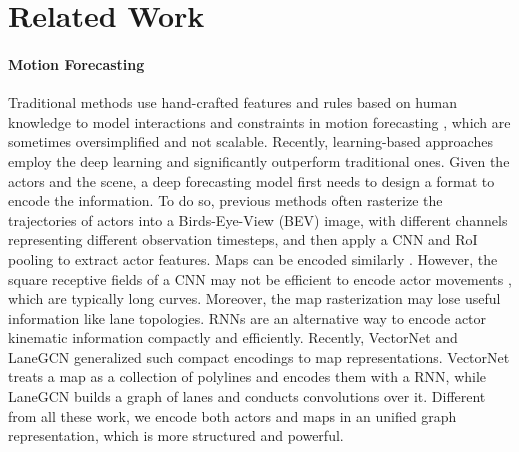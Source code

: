 


\section{Related Work}

\paragraph{Motion Forecasting}
Traditional methods use hand-crafted features and rules based on human knowledge 
to model interactions and constraints in motion forecasting
\cite{choi2013understanding,helbing1995social,mehran2009abnormal,yamaguchi2011you}, which are sometimes oversimplified and not scalable. 
Recently, learning-based approaches employ the deep learning and
significantly outperform traditional ones.
Given the actors and the scene, a deep
forecasting model first needs to design a format to encode the information.
To do so, previous methods \cite{precog,chauffeurnet,covernet} often rasterize
the trajectories of
actors into a Birds-Eye-View (BEV) image, with different channels representing
different observation timesteps, and then apply a CNN and RoI pooling
\cite{fasterrcnn} to extract actor features. 
Maps can be encoded similarly
\cite{nmp,dsd,intentnet,chauffeurnet,mfp}. 
However, the square receptive fields of a CNN may not be efficient to
encode actor movements \cite{lgn}, which are typically long curves.
Moreover, the map rasterization may lose useful information like lane topologies. 
RNNs are an alternative way to encode actor kinematic information
\cite{matf,mfp,vectornet,tnt,socialgan,sociallstm} compactly and efficiently.
Recently, VectorNet \cite{vectornet} and LaneGCN \cite{lgn} generalized such compact encodings to map representations. 
VectorNet treats a map
as a collection of polylines and encodes them with a RNN, while LaneGCN builds a
graph of lanes and conducts convolutions over it. Different from all these
work, we encode both actors and maps in an unified graph representation, which
is more structured and powerful.


